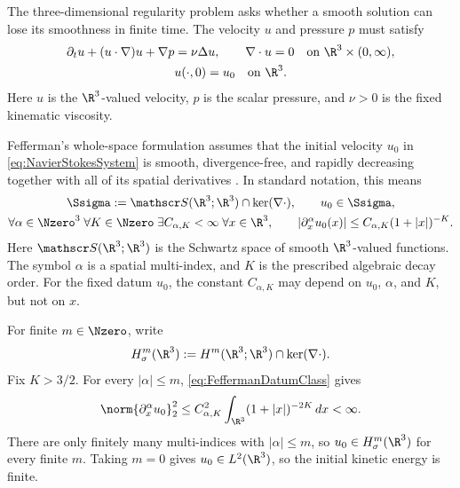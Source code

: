 The three-dimensional \NavierStokes{} regularity problem asks whether a smooth solution can lose its smoothness in finite time.
The velocity \(u\) and pressure \(p\) must satisfy
\begin{equation}\label{eq:NavierStokesSystem}
  \begin{gathered}
    \partial_tu+(u\cdot\nabla)u+\nabla p=\nu\Delta u,
    \qquad
    \nabla\cdot u=0
    \quad\text{on }\R^3\times(0,\infty),
    \\
    u(\cdot,0)=u_0
    \quad\text{on }\R^3.
  \end{gathered}
\end{equation}
Here \(u\) is the \(\R^3\)-valued velocity, \(p\) is the scalar pressure, and \(\nu>0\) is the fixed kinematic viscosity.

Fefferman's whole-space formulation assumes that the initial velocity \(u_0\) in \eqref{eq:NavierStokesSystem} is smooth, divergence-free, and rapidly decreasing together with all of its spatial derivatives \parencite{Fefferman2000}.
In standard notation, this means
\begin{equation}\label{eq:FeffermanDatumClass}
  \begin{gathered}
    \Ssigma
    :=
    \mathscr S(\R^3;\R^3)\cap\ker(\nabla\cdot),
    \qquad
    u_0\in\Ssigma,
    \\
    \forall\alpha\in\Nzero^3\;
    \forall K\in\Nzero\;
    \exists C_{\alpha,K}<\infty\;
    \forall x\in\R^3,
    \qquad
    |\partial_x^\alpha u_0(x)|
    \leq
    C_{\alpha,K}(1+|x|)^{-K}.
  \end{gathered}
\end{equation}
Here \(\mathscr S(\R^3;\R^3)\) is the Schwartz space of smooth \(\R^3\)-valued functions.
The symbol \(\alpha\) is a spatial multi-index, and \(K\) is the prescribed algebraic decay order.
For the fixed datum \(u_0\), the constant \(C_{\alpha,K}\) may depend on \(u_0\), \(\alpha\), and \(K\), but not on \(x\).

For finite \(m\in\Nzero\), write
\[
  H^m_\sigma(\R^3)
  :=
  H^m(\R^3;\R^3)\cap\ker(\nabla\cdot).
\]
Fix \(K>3/2\).
For every \(|\alpha|\leq m\), \eqref{eq:FeffermanDatumClass} gives
\[
  \norm{\partial_x^\alpha u_0}_2^2
  \leq
  C_{\alpha,K}^2
  \int_{\R^3}(1+|x|)^{-2K}\,dx
  <
  \infty.
\]
There are only finitely many multi-indices with \(|\alpha|\leq m\), so \(u_0\in H^m_\sigma(\R^3)\) for every finite \(m\).
Taking \(m=0\) gives \(u_0\in L^2(\R^3)\), so the initial kinetic energy is finite.

